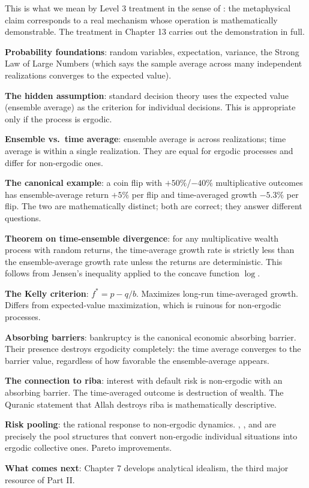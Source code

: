 This is what we mean by Level 3 treatment in the sense of :
the metaphysical claim corresponds to a real mechanism whose
operation is mathematically demonstrable. The treatment in Chapter
13 carries out the demonstration in full.

\begin{summarybox}
\textbf{Probability foundations}: random variables, expectation,
variance, the Strong Law of Large Numbers (which says the sample
average across many independent realizations converges to the
expected value).

\textbf{The hidden assumption}: standard decision theory uses the
expected value (ensemble average) as the criterion for individual
decisions. This is appropriate only if the process is ergodic.

\textbf{Ensemble vs.\ time average}: ensemble average is across
realizations; time average is within a single realization. They are
equal for ergodic processes and differ for non-ergodic ones.

\textbf{The canonical example}: a coin flip with $+50\%$/$-40\%$
multiplicative outcomes has ensemble-average return $+5\%$ per
flip and time-averaged growth $-5.3\%$ per flip. The two are
mathematically distinct; both are correct; they answer different
questions.

\textbf{Theorem on time-ensemble divergence}: for any
multiplicative wealth process with random returns, the time-average
growth rate is strictly less than the ensemble-average growth rate
unless the returns are deterministic. This follows from Jensen's
inequality applied to the concave function $\log$.

\textbf{The Kelly criterion}: $f^* = p - q/b$. Maximizes long-run
time-averaged growth. Differs from expected-value maximization,
which is ruinous for non-ergodic processes.

\textbf{Absorbing barriers}: bankruptcy is the canonical economic
absorbing barrier. Their presence destroys ergodicity completely:
the time average converges to the barrier value, regardless of how
favorable the ensemble-average appears.

\textbf{The connection to riba}: interest with default risk is
non-ergodic with an absorbing barrier. The time-averaged outcome is
destruction of wealth. The Quranic statement that Allah destroys
riba is mathematically descriptive.

\textbf{Risk pooling}: the rational response to non-ergodic
dynamics. , , and  are
precisely the pool structures that convert non-ergodic individual
situations into ergodic collective ones. Pareto improvements.

\textbf{What comes next}: Chapter 7 develops analytical idealism,
the third major resource of Part II.
\end{summarybox}

\cleardoublepage
